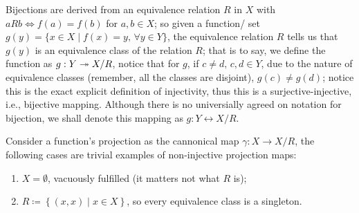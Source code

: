 \documentclass{report}
\begin{document}
Bijections are derived from an equivalence relation \(R\) in \(X\) with \(aRb \iff f(a)=f(b)\) for \(a,b \in X\); so given a function/ set \(g(y)=\{x \in X \mid f(x)=y, \, \forall  y \in  Y\}\), the equivalence relation \(R\) tells us that \(g(y)\) is an equivalence class of the relation \(R\); that is to say, we define the function as \(g: Y \twoheadrightarrow X / R\), notice that for \(g\), if \(c\neq d, \, c,d \in Y\), due to the nature of equivalence classes (remember, all the classes are disjoint), \(g(c)\neq g(d)\); notice this is the exact explicit definition of injectivity, thus this is a surjective-injective, i.e., bijective mapping. Although there is no universially agreed on notation for bijection, we shall denote this mapping as \(g : Y \leftrightarrow X / R\).

\pagebreak
{}
\begin{solution}
Consider a function's projection as the cannonical map \(\gamma  : X \to X / R\), the following cases are trivial examples of non-injective projection maps:
\begin{enumerate}
\item \(X = \emptyset\), vacuously fulfilled (it matters not what \(R\) is);
\item \(R \coloneqq \left\{ (x,x) \mid x \in  X \right\}\), so every equivalence class is a singleton.
\end{enumerate}
\end{solution}

\end{document}
